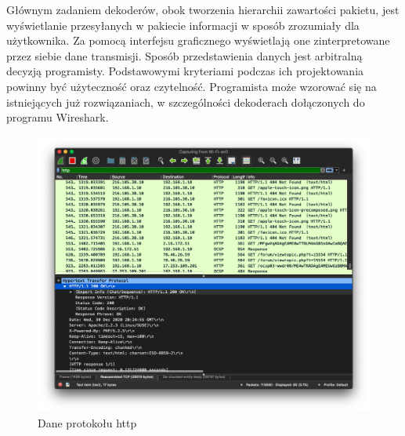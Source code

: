 \documentclass[a4paper, 12pt, twoside, openright]{article}
\begin{document}
	Głównym zadaniem dekoderów, obok tworzenia hierarchii zawartości pakietu, jest wyświetlanie przesyłanych w pakiecie informacji w sposób zrozumiały dla użytkownika.
	Za pomocą interfejsu graficznego wyświetlają one zinterpretowane przez siebie dane transmisji. Sposób przedstawienia danych
	jest arbitralną decyzją programisty. Podstawowymi kryteriami podczas ich projektowania powinny być użyteczność oraz czytelność.
	Programista może wzorować się na istniejących już rozwiązaniach, w szczególności dekoderach dołączonych do programu Wireshark.

	\begin{figure}[h]
		\centering
			\includegraphics[width=1.0\textwidth]{img/screenshot_fis_http.png}
		\caption{Dane protokołu http}
		\label{fig:fis_http}
	\end{figure}


	\newpage
\end{document}
